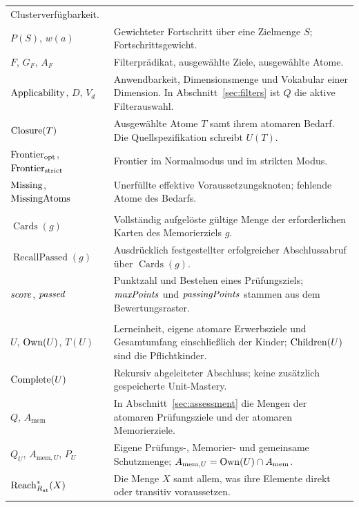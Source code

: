 \begin{longtable}{@{}P{42mm}P{106mm}@{}}
Clusterverfügbarkeit.\\
$P(S)$, $w(a)$ & Gewichteter Fortschritt über eine Zielmenge $S$;
Fortschrittsgewicht.\\
$F$, $G_F$, $A_F$ & Filterprädikat, ausgewählte Ziele, ausgewählte Atome.\\
$\operatorname{Applicability}$, $D$, $V_d$ & Anwendbarkeit, Dimensionsmenge und Vokabular einer
Dimension. In Abschnitt~\ref{sec:filters} ist $Q$ die aktive
Filterauswahl.\\
$\operatorname{Closure}(T)$ & Ausgewählte Atome $T$ samt ihrem atomaren Bedarf. Die
Quellspezifikation schreibt $U(T)$.\\
$\operatorname{Frontier}_{\mathrm{opt}}$, $\operatorname{Frontier}_{\mathrm{strict}}$ & Frontier im
Normalmodus und im strikten Modus.\\
$\operatorname{Missing}$, $\operatorname{MissingAtoms}$ & Unerfüllte effektive Voraussetzungsknoten;
fehlende Atome des Bedarfs.\\
\addlinespace
{}\\
$\operatorname{Cards}(g)$ & Vollständig aufgelöste gültige Menge der
erforderlichen Karten des Memorierziels $g$.\\
$\operatorname{RecallPassed}(g)$ & Ausdrücklich festgestellter
erfolgreicher Abschlussabruf über $\operatorname{Cards}(g)$.\\
$\mathit{score}$, $\mathit{passed}$ & Punktzahl und Bestehen eines Prüfungsziels;
$\mathit{maxPoints}$ und $\mathit{passingPoints}$ stammen aus dem Bewertungsraster.\\
\addlinespace
{}\\
$U$, $\operatorname{Own}(U)$, $T(U)$ & Lerneinheit, eigene atomare Erwerbsziele und
Gesamtumfang einschließlich der Kinder; $\operatorname{Children}(U)$ sind die
Pflichtkinder.\\
$\operatorname{Complete}(U)$ & Rekursiv abgeleiteter Abschluss; keine zusätzlich
gespeicherte Unit-Mastery.\\
$Q$, $A_{\mathrm{mem}}$ & In Abschnitt~\ref{sec:assessment} die Mengen der
atomaren Prüfungsziele und der atomaren Memorierziele.\\
$Q_U$, $A_{\mathrm{mem},U}$, $P_U$ & Eigene Prüfungs-, Memorier- und gemeinsame
Schutzmenge; $A_{\mathrm{mem},U}=\operatorname{Own}(U)\cap A_{\mathrm{mem}}$.\\
$\operatorname{Reach}_{R_{\mathrm{at}}}^{*}(X)$ & Die Menge $X$ samt allem, was ihre
Elemente direkt oder transitiv voraussetzen.\\

\end{longtable}
